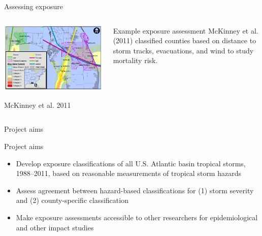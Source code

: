 \documentclass[ignorenonframetext,]{beamer}
\begin{document}
\begin{frame}{Assessing exposure}

\begin{columns}
\begin{column}{0.7\textwidth}

\begin{center}\includegraphics[width=\textwidth]{florida_direct_indirect_mortality_figure} \end{center}
\vspace{-0.6cm}
\begin{center}
\footnotesize McKinney et al. 2011
\end{center}
\end{column}
\begin{column}{0.3\textwidth}
\small
\begin{block}{Example exposure assessment}
McKinney et al. (2011) classified counties based on distance to storm tracks, evacuations, and wind to study mortality risk.
\end{block}
\end{column}
\end{columns}

\end{frame}

\begin{frame}{Project aims}

\begin{block}{Project aims}
\begin{itemize}
  \item Develop exposure classifications of all U.S. Atlantic basin tropical storms, 1988--2011, based on reasonable measurements of tropical storm hazards
  \item Assess agreement between hazard-based classifications for (1) storm severity and (2) county-specific classification
  \item Make exposure assessments accessible to other researchers for epidemiological and other impact studies 
\end{itemize}
\end{block}

\end{frame}
\end{document}
